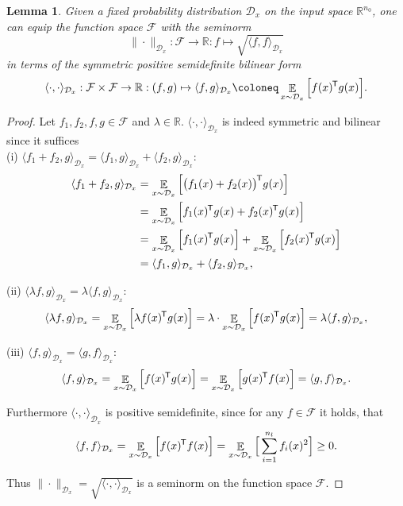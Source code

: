 \documentclass[11pt, a4paper]{article}
\newtheorem{lemma}[theorem]{Lemma}
\newcommand{\R}{\mathbb{R}}
\newcommand{\D}{\mathcal{D}}
\newcommand{\F}{\mathcal{F}}
\newcommand*{\tr}{^{\mkern-1.5mu\mathsf{T}}}
\DeclareMathOperator*{\E}{\mathbb{E}}
\begin{document}
\begin{lemma}
Given a fixed probability distribution $\D_x$ on the input space $\R^{n_0}$, one can equip the function space $\F$ with the seminorm
\[ \| \cdot \|_{\D_x} : \F \to \R : f \mapsto \sqrt{\langle f , f \rangle_{\D_x}} \] 
in terms of the symmetric positive semidefinite bilinear form
\[ \langle \cdot,\cdot \rangle_{\D_x} : \F \times \F \to \R : (f,g) \mapsto \langle f,g \rangle_{\D_x} \coloneq \E_{x \sim \D_x} \Big [ f(x)\tr g(x) \Big ].\]
\end{lemma}

\begin{proof}
Let $f_1, f_2, f, g \in \F$ and $\lambda \in \R$. $\langle \cdot,\cdot \rangle_{\D_x}$ is indeed symmetric and bilinear since it suffices \\

(i) $\langle f_1 + f_2 , g \rangle_{\D_x} = \langle f_1 , g \rangle_{\D_x} + \langle f_2 , g \rangle_{\D_x}$:
\[ \begin{split}
\langle f_1 + f_2 , g \rangle_{\D_x}
&= \E_{x \sim \D_x} \Big [ \big ( f_1(x) + f_2(x) \big )\tr g(x) \Big ] \\\
&= \E_{x \sim \D_x} \Big [ f_1(x)\tr g(x) + f_2(x)\tr g(x) \Big ] \\\
&= \E_{x \sim \D_x} \Big [ f_1(x)\tr g(x) \Big ] + \E_{x \sim \D_x} \Big [ f_2(x)\tr g(x) \Big ] \\\
&= \langle f_1 , g \rangle_{\D_x} + \langle f_2 , g \rangle_{\D_x},
\end{split} \]

(ii) $\langle \lambda f , g \rangle_{\D_x} = \lambda \langle f, g \rangle_{\D_x}$:
\[ \langle \lambda f , g \rangle_{\D_x} = \E_{x \sim \D_x} \Big [ \lambda f(x)\tr g(x) \Big ] = \lambda \cdot \E_{x \sim \D_x} \Big [ f(x)\tr g(x) \Big ] = \lambda \langle f, g \rangle_{\D_x}, \]

(iii) $\langle f , g \rangle_{\D_x} = \langle g , f \rangle_{\D_x}$:
\[ \langle f , g \rangle_{\D_x} = \E_{x \sim \D_x} \Big [ f(x)\tr g(x) \Big ] = \E_{x \sim \D_x} \Big [ g(x)\tr f(x) \Big ] = \langle g , f \rangle_{\D_x}. \]

Furthermore $\langle \cdot,\cdot \rangle_{\D_x}$ is positive semidefinite, since for any $f \in \F$ it holds, that
\[ \langle f , f \rangle_{\D_x} =  \E_{x \sim \D_x} \Big [ f(x)\tr f(x) \Big ] = \E_{x \sim \D_x} \Big [ \sum_{i=1}^{n_l} f_i(x)^2 \Big ] \geq 0. \]

Thus $\| \cdot \|_{\D_x} = \sqrt{\langle \cdot , \cdot \rangle_{\D_x}}$ is a seminorm on the function space $\F$.
\end{proof}
\end{document}
